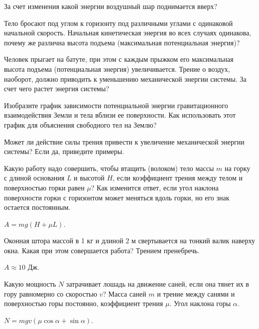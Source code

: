 \begin{ex}
За счет изменения какой энергии воздушный шар поднимается вверх?
\end{ex}

\begin{ex}
Тело бросают под углом к горизонту под различными углами с одинаковой начальной скорость. Начальная кинетическая энергия во всех случаях одинакова, почему же различна высота подъема (максимальная потенциальная энергия)?
\end{ex}

\begin{ex}
Человек прыгает на батуте, при этом с каждым прыжком его максимальная высота подъема (потенциальная энергия) увеличивается. Трение о воздух, наоборот, должно приводить к уменьшению механической энергии системы. За счет чего растет энергия системы?
\end{ex}

\begin{ex}
Изобразите график зависимости потенциальной энергии гравитационного взаимодействия Земли и тела вблизи ее поверхности. Как использовать этот график для объяснения свободного тел на Землю?
\end{ex}

\begin{ex}
Может ли действие силы трения привести к увеличение механической энергии системы? Если да, приведите примеры. 
\end{ex}

\simpleProblems

\begin{ex} %
Какую работу надо совершить, чтобы втащить (волоком) тело массы $m$ на горку с длиной основания $L$ и высотой $H$, если коэффициент трения между телом и поверхностью горки равен $\mu$? Как изменится ответ, если угол наклона поверхности горки с горизонтом может меняться вдоль горки, но его знак остается постоянным.
\begin{ans}
$A=mg(H+\mu L)$.
\end{ans}
\end{ex}

\begin{ex}
Оконная штора массой в 1 кг и длиной 2 м свертывается на тонкий валик наверху окна. Какая при этом совершается работа? Трением пренебречь.
\begin{ans}
$A \approx 10$ Дж.
\end{ans}
\end{ex}

\begin{ex} %
Какую мощность $N$ затрачивает лошадь на движение саней, если она тянет их в гору равномерно со скоростью $v$? Масса саней $m$ и трение между санями и поверхностью горы постоянно, коэффициент трения $\mu$. Угол наклона горы $\alpha$.
\begin{ans}
$N = mgv(\mu \cos \alpha +\sin \alpha)$.
\end{ans}
\end{ex}

